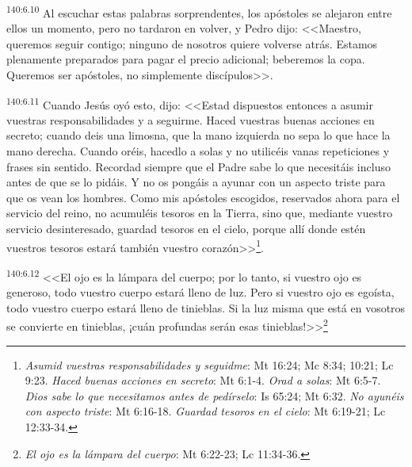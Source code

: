 \par 
\textsuperscript{140:6.10} Al escuchar estas palabras sorprendentes, los apóstoles se alejaron entre ellos un momento, pero no tardaron en volver, y Pedro dijo: <<Maestro, queremos seguir contigo; ninguno de nosotros quiere volverse atrás. Estamos plenamente preparados para pagar el precio adicional; beberemos la copa. Queremos ser apóstoles, no simplemente discípulos>>.

\par 
\textsuperscript{140:6.11} Cuando Jesús oyó esto, dijo: <<Estad dispuestos entonces a asumir vuestras responsabilidades y a seguirme. Haced vuestras buenas acciones en secreto; cuando deis una limosna, que la mano izquierda no sepa lo que hace la mano derecha. Cuando oréis, hacedlo a solas y no utilicéis vanas repeticiones y frases sin sentido. Recordad siempre que el Padre sabe lo que necesitáis incluso antes de que se lo pidáis. Y no os pongáis a ayunar con un aspecto triste para que os vean los hombres. Como mis apóstoles escogidos, reservados ahora para el servicio del reino, no acumuléis tesoros en la Tierra, sino que, mediante vuestro servicio desinteresado, guardad tesoros en el cielo, porque allí donde estén vuestros tesoros estará también vuestro corazón>>\footnote{\textit{Asumid vuestras responsabilidades y seguidme}: Mt 16:24; Mc 8:34; 10:21; Lc 9:23. \textit{Haced buenas acciones en secreto}: Mt 6:1-4. \textit{Orad a solas}: Mt 6:5-7. \textit{Dios sabe lo que necesitamos antes de pedírselo}: Is 65:24; Mt 6:32. \textit{No ayunéis con aspecto triste}: Mt 6:16-18. \textit{Guardad tesoros en el cielo}: Mt 6:19-21; Lc 12:33-34.}.

\par 
\textsuperscript{140:6.12} <<El ojo es la lámpara del cuerpo; por lo tanto, si vuestro ojo es generoso, todo vuestro cuerpo estará lleno de luz. Pero si vuestro ojo es egoísta, todo vuestro cuerpo estará lleno de tinieblas. Si la luz misma que está en vosotros se convierte en tinieblas, ¡cuán profundas serán esas tinieblas!>>\footnote{\textit{El ojo es la lámpara del cuerpo}: Mt 6:22-23; Lc 11:34-36.}

